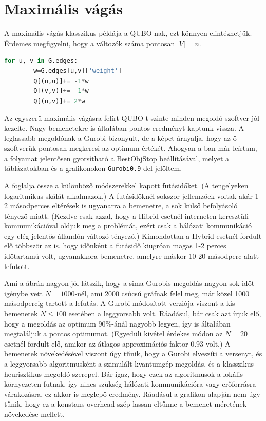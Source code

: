 \section{Maximális vágás}\label{sec:practiceMaxCut}

A maximális vágás klasszikus példája a QUBO-nak, ezt könnyen elintézhetjük.
Érdemes megfigyelni, hogy a változók száma pontosan $|V|=n$.

\begin{lstlisting}[language=python,caption=Max-cut QUBO,label=code:maxCutQUBO]
	for u, v in G.edges:
		w=G.edges[u,v]['weight']
		Q[(u,u)]+= -1*w
		Q[(v,v)]+= -1*w
		Q[(u,v)]+= 2*w
\end{lstlisting}


Az egyszerű maximális vágásra felírt QUBO-t szinte minden megoldó szoftver jól kezelte. Nagy bemenetekre is általában pontos eredményt kaptunk vissza. A leglassabb megoldónak a Gurobi bizonyult, de a képet árnyalja, hogy az ő szoftverük pontosan megkeresi az optimum értékét. Ahogyan a ban már leírtam, a folyamat jelentősen gyorsítható a BestObjStop beállításával, melyet a táblázatokban és a grafikonokon \verb+Gurobi0.9+-del jelöltem.

A  foglalja össze a különböző módszerekkel kapott futásidőket. (A tengelyeken logaritmikus skálát alkalmazok.) A futásidőknél sokszor jellemzőek voltak akár 1-2 másodperces eltérések is ugyanarra a bemenetre, a sok külső befolyásoló tényező miatt. (Kezdve csak azzal, hogy a Hibrid esetnél interneten keresztüli kommunikációval oldjuk meg a problémát, ezért csak a hálózati kommunikáció egy elég jelentős állandón változó tényező.) Kimondottan a Hybrid esetnél fordult elő többször az is, hogy időnként a futásidő kiugróan magas 1-2 perces időtartamú volt, ugyanakkora bemenetre, amelyre máskor 10-20 másodperc alatt lefutott.

Ami a  ábrán nagyon jól látszik, hogy a sima Gurobis megoldás nagyon sok időt igénybe vett $N=1000$-nél, ami 2000 csúcsú gráfnak felel meg, már közel 1000 másodpercig tartott a lefutás. A Gurobi módosított verziója viszont a kis bemenetek $N \leq 100$ esetében a leggyorsabb volt. Ráadásul, bár csak azt írjuk elő, hogy a megoldás az optimum 90\%-ánál nagyobb legyen, így is általában megtaláljuk a pontos optimumot. (Egyedüli kivétel érdekes módon az $N=20$ esetnél fordult elő, amikor az átlagos approximációs faktor 0.93 volt.)
A bemenetek növekedésével viszont úgy tűnik, hogy a Gurobi elveszíti a versenyt, és a leggyorsabb algoritmusként a szimulált kvantumgép megoldás, és a klasszikus heurisztikus megoldó szerepel. Bár igaz, hogy ezek az algoritmusok a lokális környezeten futnak, így nincs szükség hálózati kommunikációra vagy erőforrásra várakozásra, ez akkor is meglepő eredmény. Ráadásul a grafikon alapján nem úgy tűnik, hogy ez a konstans overhead szép lassan eltűnne a bemenet méretének növekedése mellett.


